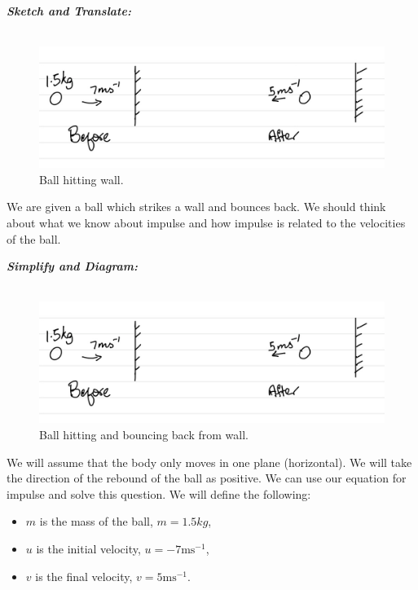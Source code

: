 \begin{subquestions}

\subquestion

\textbf{\textit{Sketch and Translate:}} \\ \\
\begin{figure}[H]
	\begin{center}
		\includegraphics[scale=0.25]{../2013/figures/2013q6-2}
		\caption{\label{2013:q6:Sketch2} Ball hitting wall.}
	\end{center}
\end{figure}	
We are given a ball which strikes a wall and bounces back. We should think about what we know about impulse and how impulse is related to the velocities of the ball.




\textbf{\textit{Simplify and Diagram:}} \\ \\
\begin{figure}[H]
	\begin{center}
		\includegraphics[scale=0.25]{../2013/figures/2013q6-2}
		\caption{\label{2013:q6:Diagram2} Ball hitting and bouncing back from wall.}
	\end{center}
\end{figure}	
We will assume that the body only moves in one plane (horizontal). We will take the direction of the rebound of the ball as positive. We can use our equation for impulse and solve this question.
We will define the following:
\begin{itemize}
	\item $m$ is the mass of the ball, $m=1.5kg$,
	\item $u$ is the initial velocity, $u=-7\text{ms}^{-1}$,
	\item $v$ is the final velocity, $v=5\text{ms}^{-1}$.
\end{itemize}





\end{subquestions}
